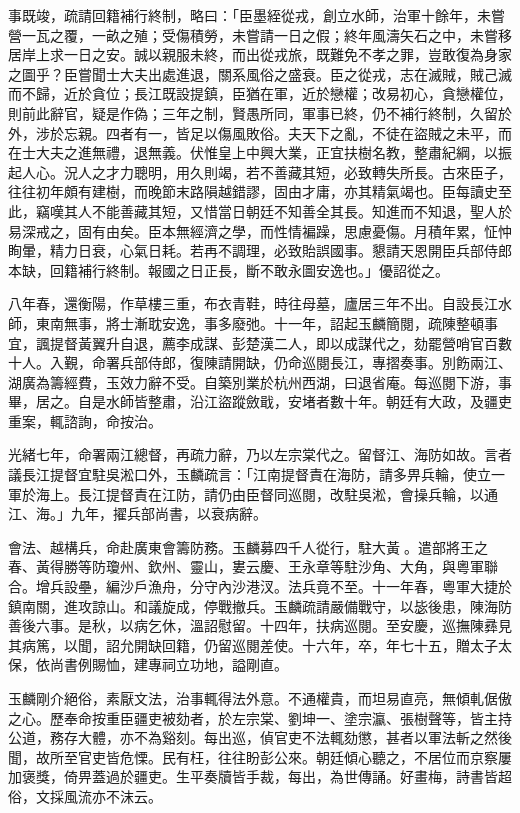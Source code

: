 \begin{pinyinscope}
事既竣，疏請回籍補行終制，略曰：「臣墨絰從戎，創立水師，治軍十餘年，未嘗營一瓦之覆，一畝之殖；受傷積勞，未嘗請一日之假；終年風濤矢石之中，未嘗移居岸上求一日之安。誠以親服未終，而出從戎旅，既難免不孝之罪，豈敢復為身家之圖乎？臣嘗聞士大夫出處進退，關系風俗之盛衰。臣之從戎，志在滅賊，賊己滅而不歸，近於貪位；長江既設提鎮，臣猶在軍，近於戀權；改易初心，貪戀權位，則前此辭官，疑是作偽；三年之制，賢愚所同，軍事已終，仍不補行終制，久留於外，涉於忘親。四者有一，皆足以傷風敗俗。夫天下之亂，不徒在盜賊之未平，而在士大夫之進無禮，退無義。伏惟皇上中興大業，正宜扶樹名教，整肅紀綱，以振起人心。況人之才力聰明，用久則竭，若不善藏其短，必致轉失所長。古來臣子，往往初年頗有建樹，而晚節末路隕越錯謬，固由才庸，亦其精氣竭也。臣每讀史至此，竊嘆其人不能善藏其短，又惜當日朝廷不知善全其長。知進而不知退，聖人於易深戒之，固有由矣。臣本無經濟之學，而性情褊躁，思慮憂傷。月積年累，怔忡眴暈，精力日衰，心氣日耗。若再不調理，必致貽誤國事。懇請天恩開臣兵部侍郎本缺，回籍補行終制。報國之日正長，斷不敢永圖安逸也。」優詔從之。

八年春，還衡陽，作草樓三重，布衣青鞋，時往母墓，廬居三年不出。自設長江水師，東南無事，將士漸耽安逸，事多廢弛。十一年，詔起玉麟簡閱，疏陳整頓事宜，諷提督黃翼升自退，薦李成謀、彭楚漢二人，即以成謀代之，劾罷營哨官百數十人。入覲，命署兵部侍郎，復陳請開缺，仍命巡閱長江，專摺奏事。別飭兩江、湖廣為籌經費，玉效力辭不受。自築別業於杭州西湖，曰退省庵。每巡閱下游，事畢，居之。自是水師皆整肅，沿江盜蹤斂戢，安堵者數十年。朝廷有大政，及疆吏重案，輒諮詢，命按治。

光緒七年，命署兩江總督，再疏力辭，乃以左宗棠代之。留督江、海防如故。言者議長江提督宜駐吳淞口外，玉麟疏言：「江南提督責在海防，請多畀兵輪，使立一軍於海上。長江提督責在江防，請仍由臣督同巡閱，改駐吳淞，會操兵輪，以通江、海。」九年，擢兵部尚書，以衰病辭。

會法、越構兵，命赴廣東會籌防務。玉麟募四千人從行，駐大黃。遣部將王之春、黃得勝等防瓊州、欽州、靈山，婁云慶、王永章等駐沙角、大角，與粵軍聯合。增兵設壘，編沙戶漁舟，分守內沙港汊。法兵竟不至。十一年春，粵軍大捷於鎮南關，進攻諒山。和議旋成，停戰撤兵。玉麟疏請嚴備戰守，以毖後患，陳海防善後六事。是秋，以病乞休，溫詔慰留。十四年，扶病巡閱。至安慶，巡撫陳彞見其病篤，以聞，詔允開缺回籍，仍留巡閱差使。十六年，卒，年七十五，贈太子太保，依尚書例賜恤，建專祠立功地，謚剛直。

玉麟剛介絕俗，素厭文法，治事輒得法外意。不通權貴，而坦易直亮，無傾軋倨傲之心。歷奉命按重臣疆吏被劾者，於左宗棠、劉坤一、塗宗瀛、張樹聲等，皆主持公道，務存大體，亦不為谿刻。每出巡，偵官吏不法輒劾懲，甚者以軍法斬之然後聞，故所至官吏皆危慄。民有枉，往往盼彭公來。朝廷傾心聽之，不居位而京察屢加褒獎，倚畀蓋過於疆吏。生平奏牘皆手裁，每出，為世傳誦。好畫梅，詩書皆超俗，文採風流亦不沫云。


\end{pinyinscope}
